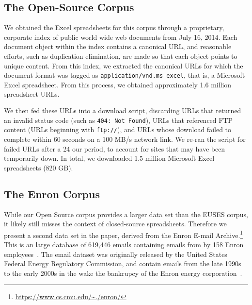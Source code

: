 \documentclass[conference]{IEEEtran}
\begin{document}
\subsection{The Open-Source Corpus}




We obtained the Excel spreadsheets for this corpus through a proprietary, corporate index of public world wide web documents from July 16, 2014. 
%
Each document object within the index contains a canonical URL, and reasonable efforts, such as duplication elimination, are made so that each object points to unique content. 
%
From this index, we extracted the canonical URLs for which the document format was tagged as \texttt{application/vnd.ms-excel}, that is, a Microsoft Excel spreadsheet. 
%
From this process, we obtained approximately 1.6 million spreadsheet URLs.

We then fed these URLs into a download script, discarding URLs that returned an invalid status code (such as \texttt{404: Not Found}), URLs that referenced FTP content (URLs beginning with \texttt{ftp://}), and URLs whose download failed to complete within 60 seconds on a 100 MB/s network link. 
%
We re-ran the script for failed URLs after a 24 our period, to account for sites that may have been temporarily down. 
%
In total, we downloaded 1.5 million Microsoft Excel spreadsheets (820 GB). 


\subsection{The Enron Corpus}

While our Open Source corpus provides a larger data set than the EUSES corpus, 
it likely still misses the context of closed-source spreadsheets. 
Therefore we present a second data set in the paper, derived from
the Enron E-mail Archive.\footnote{\url{https://www.cs.cmu.edu/~./enron/}} 
This is an large database of 619,446 emails
containing emails from by 158 Enron employees~\cite{klimt2004introducing}.
The email dataset was originally released by the United States 
Federal Energy Regulatory Commission, and contain emails from the 
late 1990s to the early 2000s in the wake the bankrupcy of the Enron
energy corporation~\cite{grieve}.
\end{document}
